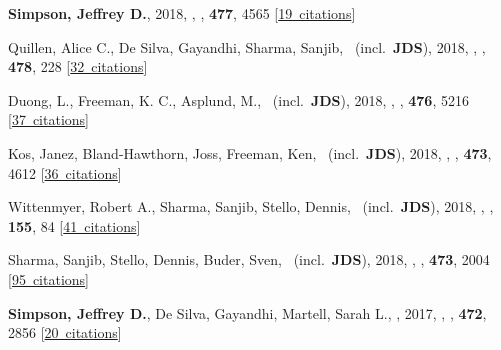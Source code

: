 \item[{\color{numcolor}\scriptsize18}] \textbf{Simpson, Jeffrey D.}, 2018, , \mnras, \textbf{477}, 4565 [\href{https://ui.adsabs.harvard.edu/#abs/2018MNRAS.477.4565S}{19~citations}]

\item[{\color{numcolor}\scriptsize17}] Quillen, Alice C., De Silva, Gayandhi, Sharma, Sanjib, \etal\ (incl.\ \textbf{JDS}), 2018, , \mnras, \textbf{478}, 228 [\href{https://ui.adsabs.harvard.edu/#abs/2018MNRAS.478..228Q}{32~citations}]

\item[{\color{numcolor}\scriptsize16}] Duong, L., Freeman, K. C., Asplund, M., \etal\ (incl.\ \textbf{JDS}), 2018, , \mnras, \textbf{476}, 5216 [\href{https://ui.adsabs.harvard.edu/#abs/2018MNRAS.476.5216D}{37~citations}]

\item[{\color{numcolor}\scriptsize15}] Kos, Janez, Bland-Hawthorn, Joss, Freeman, Ken, \etal\ (incl.\ \textbf{JDS}), 2018, , \mnras, \textbf{473}, 4612 [\href{https://ui.adsabs.harvard.edu/#abs/2018MNRAS.473.4612K}{36~citations}]

\item[{\color{numcolor}\scriptsize14}] Wittenmyer, Robert A., Sharma, Sanjib, Stello, Dennis, \etal\ (incl.\ \textbf{JDS}), 2018, , \aj, \textbf{155}, 84 [\href{https://ui.adsabs.harvard.edu/#abs/2018AJ....155...84W}{41~citations}]

\item[{\color{numcolor}\scriptsize13}] Sharma, Sanjib, Stello, Dennis, Buder, Sven, \etal\ (incl.\ \textbf{JDS}), 2018, , \mnras, \textbf{473}, 2004 [\href{https://ui.adsabs.harvard.edu/#abs/2018MNRAS.473.2004S}{95~citations}]

\item[{\color{numcolor}\scriptsize12}] \textbf{Simpson, Jeffrey D.}, De Silva, Gayandhi, Martell, Sarah L., \etal, 2017, , \mnras, \textbf{472}, 2856 [\href{https://ui.adsabs.harvard.edu/#abs/2017MNRAS.472.2856S}{20~citations}]

